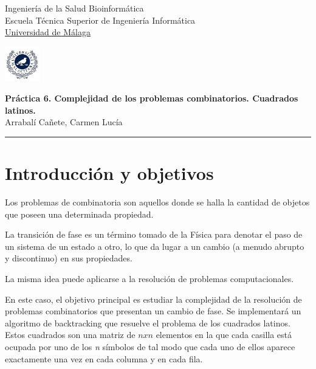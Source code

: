 \documentclass[11pt,letterpaper]{article}
\begin{document}

\usetikzlibrary{positioning}
\pagestyle{plain}
\begin{flushleft}
Ingeniería de la Salud \hfill Bioinformática\\
Escuela Técnica Superior de Ingeniería Informática\\
\underline{Universidad de Málaga}
\end{flushleft}

\begin{flushright}\vspace{-5mm}
\includegraphics[height=1.5cm]{escudo.jpg}
\end{flushright}

\begin{center}\vspace{-1cm}
\textbf{\large Práctica 6. Complejidad de los problemas combinatorios. Cuadrados latinos.}\\   %
Arrabalí Cañete, Carmen Lucía\\                         %
\end{center}
\rule{\linewidth}{0.1mm}


\section{Introducción y objetivos}
Los problemas de combinatoria son aquellos donde se halla la cantidad de objetos que poseen una determinada propiedad. 

La transición de fase es un término tomado de la Física para denotar el paso de un sistema de un estado a otro, lo que da lugar a un cambio (a menudo abrupto y discontinuo) en sus propiedades.

La misma idea puede aplicarse a la resolución de problemas computacionales.

En este caso, el objetivo principal es estudiar la complejidad de la resolución de problemas combinatorios que presentan un cambio de fase. Se implementará un algoritmo de backtracking que resuelve el problema de los cuadrados latinos. Estos cuadrados son una matriz de $nxn$ elementos en la que cada casilla está ocupada por uno de los \textit{n} símbolos de tal modo que cada uno de ellos aparece exactamente una vez en cada columna y en cada fila.
\end{document}
